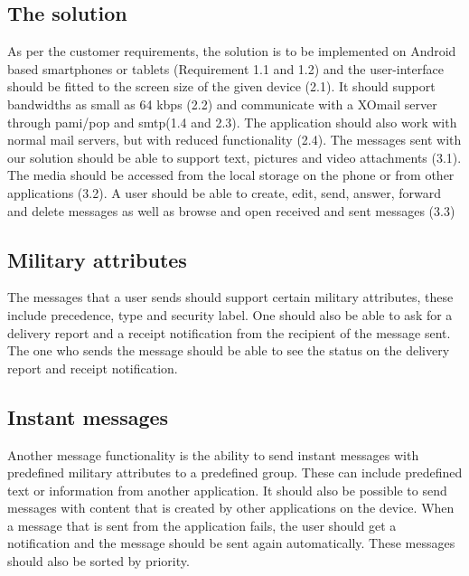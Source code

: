 \subsection{The solution}
As per the customer requirements, the solution is to be implemented on Android based smartphones or tablets (Requirement 1.1 and 1.2) and the user-interface should be fitted to the screen size of the given device (2.1). It should support bandwidths as small as 64 kbps (2.2) and communicate with a XOmail server through \gls{pami}/\gls{pop} and \gls{smtp}(1.4 and 2.3). The application should also work with normal mail servers, but with reduced functionality (2.4).
\newline
\newline
The messages sent with our solution should be able to support text, pictures and video attachments (3.1). The media should be accessed from the local storage on the phone or from other applications (3.2). A user should be able to create, edit, send, answer, forward and delete messages as well as browse and open received and sent messages (3.3)

\subsection{Military attributes}
The messages that a user sends should support certain military attributes, these include precedence, type and security label. 
\newline
\newline
One should also be able to ask for a delivery report and a receipt notification from the recipient of the message sent. The one who sends the message should be able to see the status on the delivery report and receipt notification.

\subsection{Instant messages}
Another message functionality is the ability to send instant messages with predefined military attributes to a predefined group. These can include predefined text or information from another application. It should also be possible to send messages with content that is created by other applications on the device.
\newline
\newline
When a message that is sent from the application fails, the user should get a notification and the message should be sent again automatically. These messages should also be sorted by priority.

